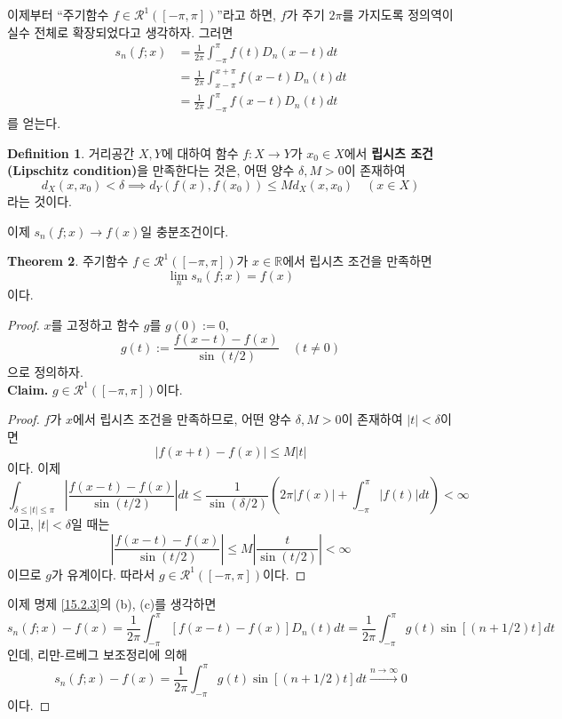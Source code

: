 \documentclass[11pt]{book}
\numberwithin{equation}{chapter}
\def\RR{\mathbb{R}}
\def\calR{\mathcal{R}}
\newcommand{\abs}[1]{\left\vert#1\right\vert}
\newcommand{\paren}[1]{\left(#1\right)}
\theoremstyle{definition}
\newtheorem{thm}{Theorem}[section]
\newtheorem{defn}[thm]{Definition}
\begin{document}
이제부터 ``주기함수 \(f \in \calR^1([-\pi, \pi])\)''라고 하면, \(f\)가 주기 \(2\pi\)를 가지도록 정의역이 실수 전체로 확장되었다고 생각하자. 그러면
\begin{align*}
    s_n(f; x) &= \frac{1}{2\pi} \int_{-\pi}^\pi f(t) D_n(x-t) dt\\
    &= \frac{1}{2\pi} \int_{x-\pi}^{x+\pi} f(x-t) D_n(t) dt\\
    &= \frac{1}{2\pi} \int_{-\pi}^{\pi} f(x-t) D_n(t) dt
\end{align*}
를 얻는다.

\begin{defn}
    거리공간 \(X, Y\)에 대하여 함수 \(f : X \to Y\)가 \(x_0 \in X\)에서 \textbf{립시츠 조건(Lipschitz condition)}을 만족한다는 것은, 어떤 양수 \(\delta, M > 0\)이 존재하여
    \[
        d_X(x, x_0) < \delta \implies d_Y(f(x), f(x_0)) \le M d_X(x, x_0) \quad (x \in X)
    \]
    라는 것이다.
\end{defn}

이제 \(s_n(f ; x) \to f(x)\)일 충분조건이다.

\begin{thm}
    주기함수 \(f \in \calR^1([-\pi, \pi])\)가 \(x \in \RR\)에서 립시츠 조건을 만족하면
    \[
        \lim_{n} s_n(f; x) = f(x)
    \]
    이다.
\end{thm}
\begin{proof}
    \(x\)를 고정하고 함수 \(g\)를 \(g(0) := 0\),
    \[
        g(t) := \frac{f(x - t) - f(x)}{\sin (t/2)} \quad (t \ne 0)
    \]
    으로 정의하자.\\
    \textbf{Claim.} \(g \in \calR^1([-\pi, \pi])\)이다.
    \begin{proof}
        \(f\)가 \(x\)에서 립시츠 조건을 만족하므로, 어떤 양수 \(\delta, M > 0\)이 존재하여 \(\abs{t} < \delta\)이면
        \[
            \abs{f(x + t) - f(x)} \le M\abs{t}
        \]
        이다. 이제
        \[
            \int_{\delta \le \abs{t} \le \pi} \abs{\frac{f(x - t) - f(x)}{\sin (t/2)}} dt \le \frac{1}{\sin(\delta/2)} \paren{2\pi\abs{f(x)} + \int_{-\pi}^\pi \abs{f(t)} dt} < \infty
        \]
        이고, \(\abs{t} < \delta\)일 때는
        \[
            \abs{\frac{f(x - t) - f(x)}{\sin (t/2)}} \le M \abs{\frac{t}{\sin (t/2)}} < \infty
        \]
        이므로 \(g\)가 유계이다. 따라서 \(g \in \calR^1([-\pi, \pi])\)이다.
    \end{proof}
    이제 명제 \ref{15.2.3}의 (b), (c)를 생각하면
    \[
        s_n(f; x) - f(x) = \frac{1}{2\pi} \int_{-\pi}^{\pi} [f(x-t) - f(x)] D_n(t) dt = \frac{1}{2\pi} \int_{-\pi}^{\pi} g(t) \sin[(n+1/2)t] dt
    \]
    인데, 리만-르베그 보조정리에 의해
    \[
        s_n(f; x) - f(x) = \frac{1}{2\pi} \int_{-\pi}^{\pi} g(t) \sin[(n+1/2)t] dt \xrightarrow[]{n \to \infty} 0
    \]
    이다.
\end{proof}
\end{document}
